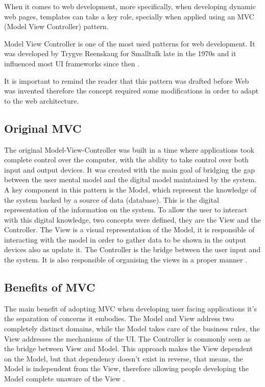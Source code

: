 When it comes to web development, more specifically, when developing dynamic web pages, templates can take a key role, specially when applied using an MVC (Model View Controller) pattern.

Model View Controller is one of the most used patterns for web development. It was developed by Trygve Reenskaug for Smalltalk late in the 1970s \cite{Reenskaug1979THING-MODEL-VIEW-EDITORPlanningsystem} and it influenced most UI frameworks since then \cite{Fowler2003PatternsArchitecture}.

It is important to remind the reader that this pattern was drafted before Web was invented therefore the concept required some modifications in order to adapt to the web architecture.

\subsection{Original MVC}

The original Model-View-Controller was built in a time where applications took complete control over the computer, with the ability to take control over both input and output devices. It was created with the main goal of bridging the gap between the user mental model and the digital model maintained by the system. A key component in this pattern is the Model, which represent the knowledge of the system backed by a source of data (database). This is the digital representation of the information on the system. To allow the user to interact with this digital knowledge, two concepts were defined, they are the View and the Controller. The View is a visual representation of the Model, it is responsible of interacting with the model in order to gather data to be shown in the output devices also as update it. The Controller is the bridge between the user input and the system. It is also responsible of organising the views in a proper manner \cite{Reenskaug1979THING-MODEL-VIEW-EDITORPlanningsystem}.


\subsection{Benefits of MVC}

The main benefit of adopting MVC when developing user facing applications it’s the separation of concerns it embodies. The Model and View address two completely distinct domains, while the Model takes care of the business rules, the View addresses the mechanisms of the UI. The Controller is commonly seen as the bridge between View and Model. This approach makes the View dependent on the Model, but that dependency doesn’t exist in reverse, that means, the Model is independent from the View, therefore allowing people developing the Model complete unaware of the View \cite{Parr2008TheSeparation, Parr2004EnforcingEngines, Fowler2003PatternsArchitecture}.

